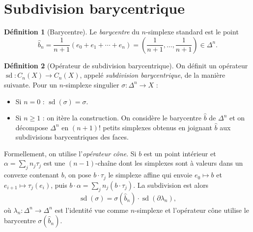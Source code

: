 \documentclass[12pt,a4paper,openany]{book}
\theoremstyle{definition}
\newtheorem{definition}{Définition}[chapter]
\theoremstyle{plain}
\theoremstyle{remark}
\begin{document}
\section{Subdivision barycentrique}\label{sec:subdivision-barycentrique}

\begin{definition}[Barycentre]\label{def:barycentre}
Le \emph{barycentre} du $n$-simplexe standard est le point
\[
  \hat{b}_n = \frac{1}{n+1}(e_0 + e_1 + \cdots + e_n) = \left(\frac{1}{n+1}, \ldots, \frac{1}{n+1}\right) \in \Delta^n.
\]
\end{definition}

\begin{definition}[Opérateur de subdivision barycentrique]\label{def:operateur-subdivision}
On définit un opérateur $\operatorname{sd} \colon C_n(X) \to C_n(X)$, appelé \emph{subdivision
barycentrique}, de la manière suivante. Pour un $n$-simplexe singulier $\sigma \colon \Delta^n \to X$ :
\begin{itemize}
  \item Si $n = 0$ : $\operatorname{sd}(\sigma) = \sigma$.
  \item Si $n \geq 1$ : on itère la construction. On considère le barycentre $\hat{b}$ de $\Delta^n$
  et on décompose $\Delta^n$ en $(n+1)!$ petits simplexes obtenus en joignant $\hat{b}$ aux
  subdivisions barycentriques des faces.
\end{itemize}
Formellement, on utilise l'\emph{opérateur cône}. Si $b$ est un point intérieur et
$\alpha = \sum_j n_j \tau_j$ est une $(n-1)$-chaîne dont les simplexes sont à valeurs dans un
convexe contenant $b$, on pose $b \cdot \tau_j$ le simplexe affine qui envoie
$e_0 \mapsto b$ et $e_{i+1} \mapsto \tau_j(e_i)$, puis $b \cdot \alpha = \sum_j n_j (b \cdot \tau_j)$.
La subdivision est alors
\[
  \operatorname{sd}(\sigma) = \sigma(\hat{b}_n) \cdot \operatorname{sd}(\partial \lambda_n),
\]
où $\lambda_n \colon \Delta^n \to \Delta^n$ est l'identité vue comme $n$-simplexe et l'opérateur cône
utilise le barycentre $\sigma(\hat{b}_n)$.
\end{definition}
\end{document}
